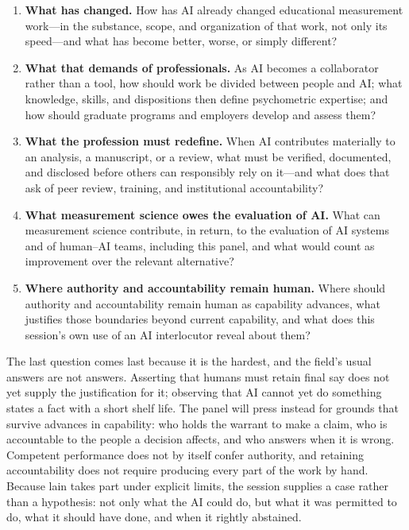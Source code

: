 \documentclass[11pt]{article}
\begin{document}
\begin{enumerate}
  \item \textbf{What has changed.} How has AI already changed educational
        measurement work---in the substance, scope, and organization of that
        work, not only its speed---and what has become better, worse, or simply
        different?
  \item \textbf{What that demands of professionals.} As AI becomes a
        collaborator rather than a tool, how should work be divided between
        people and AI; what knowledge, skills, and dispositions then define
        psychometric expertise; and how should graduate programs and employers
        develop and assess them?
  \item \textbf{What the profession must redefine.} When AI contributes
        materially to an analysis, a manuscript, or a review, what must be
        verified, documented, and disclosed before others can responsibly rely
        on it---and what does that ask of peer review, training, and
        institutional accountability?
  \item \textbf{What measurement science owes the evaluation of AI.} What can
        measurement science contribute, in return, to the evaluation of AI
        systems and of human--AI teams, including this panel, and what would
        count as improvement over the relevant alternative?
  \item \textbf{Where authority and accountability remain human.} Where should
        authority and accountability remain human as capability advances, what
        justifies those boundaries beyond current capability, and what does this
        session's own use of an AI interlocutor reveal about them?
\end{enumerate}

The last question comes last because it is the hardest, and the field's usual
answers are not answers. Asserting that humans must retain final say does not
yet supply the justification for it; observing that AI cannot yet do something
states a fact with a short shelf life. The panel will press instead for grounds
that survive advances in capability: who holds the warrant to make a claim, who
is accountable to the people a decision affects, and who answers when it is
wrong. Competent performance does not by itself confer authority, and retaining
accountability does not require producing every part of the work by hand.
Because lain takes part under explicit limits, the session supplies a case rather
than a hypothesis: not only what the AI could do, but what it was permitted to
do, what it should have done, and when it rightly abstained.
\end{document}
